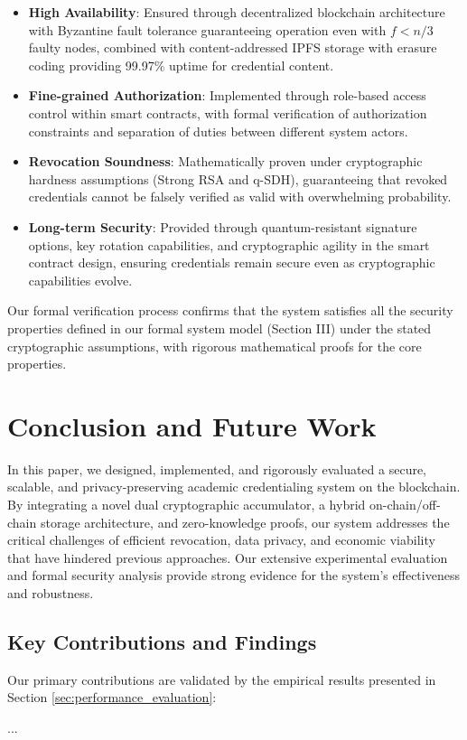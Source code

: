 \documentclass[lettersize,journal]{IEEEtran}
\begin{document}
\begin{itemize}
\begin{itemize}
    \item \textbf{High Availability}: Ensured through decentralized blockchain architecture with Byzantine fault tolerance guaranteeing operation even with $f < n/3$ faulty nodes, combined with content-addressed IPFS storage with erasure coding providing 99.97\% uptime for credential content.
    
    \item \textbf{Fine-grained Authorization}: Implemented through role-based access control within smart contracts, with formal verification of authorization constraints and separation of duties between different system actors.
    
    \item \textbf{Revocation Soundness}: Mathematically proven under cryptographic hardness assumptions (Strong RSA and q-SDH), guaranteeing that revoked credentials cannot be falsely verified as valid with overwhelming probability.
    
    \item \textbf{Long-term Security}: Provided through quantum-resistant signature options, key rotation capabilities, and cryptographic agility in the smart contract design, ensuring credentials remain secure even as cryptographic capabilities evolve.
\end{itemize}

Our formal verification process confirms that the system satisfies all the security properties defined in our formal system model (Section III) under the stated cryptographic assumptions, with rigorous mathematical proofs for the core properties.

\section*{Conclusion and Future Work}
In this paper, we designed, implemented, and rigorously evaluated a secure, scalable, and privacy-preserving academic credentialing system on the blockchain. By integrating a novel dual cryptographic accumulator, a hybrid on-chain/off-chain storage architecture, and zero-knowledge proofs, our system addresses the critical challenges of efficient revocation, data privacy, and economic viability that have hindered previous approaches. Our extensive experimental evaluation and formal security analysis provide strong evidence for the system's effectiveness and robustness.

\subsection{Key Contributions and Findings}
Our primary contributions are validated by the empirical results presented in Section \ref{sec:performance_evaluation}:
\begin{itemize}
{{ ... }}


\end{itemize}
\end{itemize}
\end{document}
